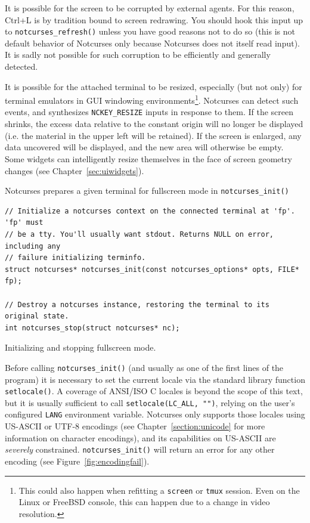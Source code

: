 \documentclass[letterpaper,10pt]{article}
\begin{document}
It is possible for the screen to be corrupted by external agents. For this
reason, Ctrl+L is by tradition bound to screen redrawing. You should hook this
input up to \texttt{notcurses\_refresh()} unless you have good reasons not to
do so (this is not default behavior of Notcurses only because Notcurses does
not itself read input). It is sadly not possible for such corruption to be
efficiently and generally detected.

It is possible for the attached terminal to be resized, especially (but not
only) for terminal emulators in GUI windowing environments\footnote{This could
also happen when refitting a \texttt{screen} or \texttt{tmux} session.
Even on the Linux or FreeBSD console, this can happen due to a change in video
resolution.}. Notcurses can detect such events, and synthesizes
\texttt{NCKEY\_RESIZE} inputs in response to them. If the screen shrinks, the
excess data relative to the constant origin will no longer be displayed (i.e.
the material in the upper left will be retained). If the screen is enlarged,
any data uncovered will be displayed, and the new area will otherwise be empty.
Some widgets can intelligently resize themselves in the face of screen
geometry changes (see Chapter~\ref{sec:uiwidgets}).

Notcurses prepares a given terminal for fullscreen mode in \texttt{notcurses\_init()}

\begin{listing}[!htbp]
\begin{verbatim}
// Initialize a notcurses context on the connected terminal at 'fp'. 'fp' must
// be a tty. You'll usually want stdout. Returns NULL on error, including any
// failure initializing terminfo.
struct notcurses* notcurses_init(const notcurses_options* opts, FILE* fp);

// Destroy a notcurses instance, restoring the terminal to its original state.
int notcurses_stop(struct notcurses* nc);
\end{verbatim}
\caption{Initializing and stopping fullscreen mode.}
\end{listing}

Before calling \texttt{notcurses\_init()} (and usually as one of the first lines
of the program) it is necessary to set the current locale via the standard
library function \texttt{setlocale()}. A coverage of ANSI/ISO C locales is beyond
the scope of this text, but it is usually sufficient to call
\texttt{setlocale(LC\_ALL, "")}, relying on the user's configured \texttt{LANG}
environment variable. Notcurses only supports those locales using
US-ASCII or UTF-8 encodings (see Chapter~\ref{section:unicode} for more
information on character encodings), and its capabilities on US-ASCII
are \textit{severely} constrained. \texttt{notcurses\_init()} will return an
error for any other encoding (see Figure~\ref{fig:encodingfail}).
\end{document}
